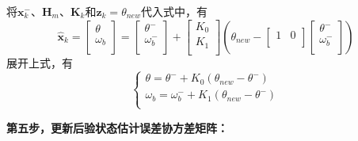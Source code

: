 将$\boldsymbol{x}_{k}^{-}$、$\boldsymbol{H}_m$、$\boldsymbol{K}_k$和$\boldsymbol{z}_k = \theta _{new}$代入式中，有
$$
\boldsymbol{\hat{x}}_k=\left[ \begin{array}{c}
	\theta\\
	\omega _b\\
\end{array} \right] =\left[ \begin{array}{c}
	\theta ^-\\
	\omega _{b}^{-}\\
\end{array} \right] +\left[ \begin{array}{c}
	K_0\\
	K_1\\
\end{array} \right] \left( \theta _{new}-\left[ \begin{matrix}
	1&		0\\
\end{matrix} \right] \left[ \begin{array}{c}
	\theta ^-\\
	\omega _{b}^{-}\\
\end{array} \right] \right) 
$$
展开上式，有
$$
\left\{ \begin{array}{l}
	\theta =\theta ^-+K_0\left( \theta _{new}-\theta ^- \right)\\
	\omega _b=\omega _{b}^{-}+K_1\left( \theta _{new}-\theta ^- \right)\\
\end{array} \right. 
$$

\textbf{第五步，更新后验状态估计误差协方差矩阵：}

